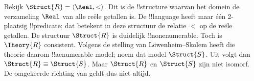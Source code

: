 \documentclass[../../../include/open-logic-section]{subfiles}
\begin{document}
\begin{rem}
  Bekijk $\Struct{R} = \langle\Real, <\rangle$. Dit is de !!{structure}
  waarvan het domein de verzameling $\Real$ van alle reële getallen is.
  De !!{language} heeft maar één 2-plaatsig !!{predicate}; dat betekent
  in deze structuur de relatie $<$ op de reële getallen. De structuur
  $\Struct{R}$ is duidelijk !!{nonenumerable}. Toch is $\Theory{R}$
  consistent. Volgens de stelling van L\"owenheim--Skolem heeft die
  theorie daarom !!a{enumerable} model; noem dat model $\Struct{S}$.
  Uit  volgt dan $\Struct{R} \equiv \Struct{S}$.
  Maar $\Struct{R}$ en $\Struct{S}$ zijn niet isomorf. De omgekeerde
  richting van  geldt dus niet altijd.
\end{rem}
\end{document}
